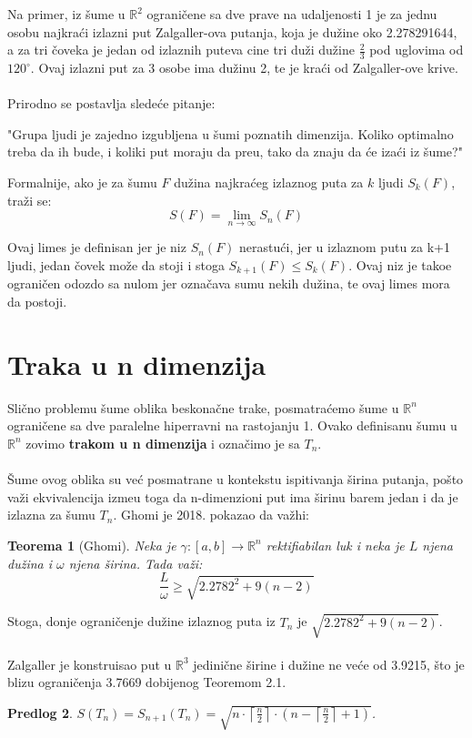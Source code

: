 \documentclass[11pt,letter]{article}
\newtheorem{teo}{\bf Teorema}[section]
\newtheorem{pred}[teo]{\bf Predlog}
\begin{document}
\indent Na primer, iz \v sume u $\mathbb{R}^2$ ograni\v cene sa dve prave na udaljenosti 1 je za jednu osobu najkra\' ci izlazni put Zalgaller-ova putanja, koja je du\v zine oko 2.278291644, a za tri \v coveka je jedan od izlaznih puteva cine tri du\v zi du\v zine $\frac{2}{3}$ pod uglovima od $120^\circ$. Ovaj izlazni put za 3 osobe ima du\v zinu 2, te je kra\' ci od Zalgaller-ove krive.
\\
\smallskip
\\
\indent Prirodno se postavlja slede\' ce pitanje:
\begin{center}
"Grupa ljudi je zajedno izgubljena u \v sumi poznatih dimenzija. Koliko optimalno treba da ih bude, i koliki put moraju da pre\dj u, tako da znaju da \' ce iza\' ci iz \v sume?"
\end{center}
Formalnije, ako je za \v sumu $F$ du\v zina najkra\' ceg izlaznog puta za $k$ ljudi $S_k(F)$, tra\v zi se:
$$S(F)=\lim_{n \to \infty} S_n(F)$$

\indent Ovaj limes je definisan jer je niz $S_n(F)$ nerastu\' ci, jer u izlaznom putu za k+1 ljudi, jedan \v covek mo\v ze da stoji i stoga $S_{k+1}(F)\leqslant S_{k}(F)$. Ovaj niz je tako\dj e ograni\v cen odozdo sa nulom jer ozna\v cava sumu nekih du\v zina, te ovaj limes mora da postoji. 
\\
\section[Traka u n dimenzija]{Traka u n dimenzija}
\bigskip
 Sli\v cno problemu \v sume oblika beskona\v cne trake, posmatra\' cemo \v sume u $\mathbb{R}^n$ ograni\v cene sa dve paralelne hiperravni na rastojanju 1. Ovako definisanu \v sumu u $\mathbb{R}^n$ zovimo \textbf{trakom u n dimenzija} i ozna\v cimo je sa $T_n$.
\\
\\
\indent \v Sume ovog oblika su ve\' c posmatrane u kontekstu ispitivanja \v sirina putanja, po\v sto va\v zi ekvivalencija izme\dj u toga da n-dimenzioni put ima \v sirinu barem jedan i da je izlazna za \v sumu $T_n$. Ghomi je 2018. pokazao da va\v zhi:
\smallskip
\begin{teo}[Ghomi] 
Neka je $\gamma: [a,b]\to \mathbb{R}^n$ rektifiabilan luk i neka je $L$ njena du\v zina i $\omega$ njena \v sirina. Tada va\v zi:
$$\frac{L}{\omega}\geqslant \sqrt{2.2782^2+9(n-2)}$$
\end{teo}
\bigskip

\indent Stoga, donje ograni\v cenje du\v zine izlaznog puta iz $T_n$ je $ \sqrt{2.2782^2+9(n-2)}$.
\\
\\
Zalgaller je konstruisao put u $\mathbb{R}^3$ jedini\v cne \v sirine i du\v zine ne ve\' ce od 3.9215, \v sto je blizu ograni\v cenja 3.7669 dobijenog Teoremom 2.1.
\\
\begin{pred} $S(T_n)=S_{n+1}(T_n)=\sqrt{n\cdot\left\lceil\frac{n}{2}\right\rceil\cdot\left( n-\left\lceil\frac{n}{2}\right\rceil+1\right)}$.\end{pred}
\smallskip
\end{document}
